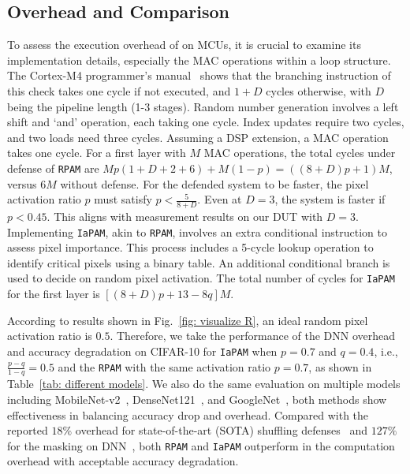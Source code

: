 \subsection{Overhead and Comparison}
To assess the execution overhead of \method on MCUs, it is crucial to examine its implementation details, especially the MAC operations within a loop structure. 
The Cortex-M4 programmer's manual~\cite{cortex-M4} shows that the branching instruction of this check takes one cycle if not executed, and $1+D$ cycles otherwise, with $D$ being the pipeline length (1-3 stages). Random number generation involves a left shift and `and' operation, each taking one cycle. Index updates require two cycles, and two loads need three cycles. Assuming a DSP extension, a MAC operation takes one cycle. For a first layer with $M$ MAC operations, the total cycles under defense of \texttt{RPAM} are $Mp(1+D+2+6)+M(1-p)=((8+D)p+1)M$, versus $6M$ without defense. For the defended system to be faster, the pixel activation ratio $p$ must satisfy $p < \frac{5}{8+D}$. Even at $D = 3$, the system is faster if $p < 0.45$. This aligns with measurement results on our DUT with $D=3$.
Implementing \texttt{IaPAM}, akin to \texttt{RPAM}, involves an extra conditional instruction to assess pixel importance. This process includes a 5-cycle lookup operation to identify critical pixels using a binary table.  An additional conditional branch is used to decide on random pixel activation. The total number of cycles for \texttt{IaPAM} for the first layer is $[(8+D)p+13-8q]M$.

According to results shown in Fig.~\ref{fig: visualize R}, an ideal random pixel activation ratio is $0.5$. 
Therefore, we take the performance of the DNN overhead and accuracy degradation on CIFAR-10 for \texttt{IaPAM} when $p=0.7$ and $q=0.4$, i.e., $\frac{p-q}{1-q}=0.5$ and the \texttt{RPAM} with the same activation ratio $p=0.7$, as shown in Table~\ref{tab: different models}.
We also do the same evaluation on multiple models including MobileNet-v2~\cite{sandler2018mobilenetv2}, DenseNet121~\cite{huang2017densely}, and GoogleNet~\cite{szegedy2015going}, both methods show effectiveness in balancing accuracy drop and overhead.
Compared with the reported $18\%$ overhead for state-of-the-art (SOTA) shuffling defenses~\cite{brosch2022counteract} and $127\%$ for the masking on DNN~\cite{dubey2020maskednet}, both \texttt{RPAM} and \texttt{IaPAM} outperform in the computation overhead with acceptable accuracy degradation.


